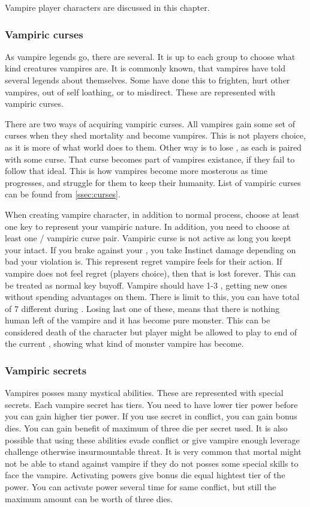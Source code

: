 Vampire player characters are discussed in this chapter.

\subsubsection{Vampiric curses}

As vampire legends go, there are several.
It is up to each group to choose what kind creatures vampires are.
It is commonly known, that vampires have told several legends about themselves.
Some have done this to frighten, hurt other vampires, out of self loathing, or to misdirect.
These are represented with vampiric curses.

There are two ways of acquiring vampiric curses.
All vampires gain some set of curses when they shed mortality and become vampires.
This is not players choice, as it is more of what world does to them.
Other way is to lose \humanity{}, as each \humanity{} is paired with some curse.
That curse becomes part of vampires existance, if they fail to follow that ideal.
This is how vampires become more mosterous as time progresses, and struggle for them to keep their humanity.
List of vampiric curses can be found from \ref{ssec:curses}.

When creating vampire character, in addition to normal process, choose at least one key to represent your vampiric nature.
In addition, you need to choose at least one \humanity{} / vampiric curse pair.
Vampiric curse is not active as long you keept your \humanity{} intact.
If you brake against your \humanity{}, you take Instinct damage depending on bad your violation is.
This represent regret vampire feels for their action.
If vampire does not feel regret (players choice), then that \humanity{} is lost forever.
This can be treated as normal key buyoff.
Vampire should have 1-3 \humanities{}, getting new ones without spending advantages on them.
There is limit to this, you can have total of 7 different \humanities{} during \campaign{}.
Losing last one of these, means that there is nothing human left of the vampire and it has become pure monster.
This can be considered death of the character but player might be allowed to play to end of the current \session{}, showing what kind of monster vampire has become.

\cols{
\CurseSecret{}
}

\subsubsection{Vampiric secrets}
Vampires posses many mystical abilities.
These are represented with special secrets.
Each vampire secret has tiers.
You need to have lower tier power before you can gain higher tier power.
If you use secret in conflict, you can gain bonus dies.
You can gain benefit of maximum of three die per secret used.
It is also possible that using these abilities evade conflict or give vampire enough leverage challenge otherwise insurmountable threat.
It is very common that mortal might not be able to stand against vampire if they do not posses some special skills to face the vampire.
Activating powers give bonus die equal hightest tier of the power.
You can activate power several time for same conflict, but still the maximum amount can be worth of three dies.

